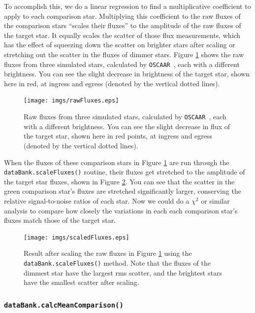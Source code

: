 \documentclass[a4paper]{article}
\newcommand{\code}[1]{\texttt{#1}}
\newcommand{\oscaar}{\code{OSCAAR}~}
\begin{document}
To accomplish this, we do a linear regression to find a multiplicative coefficient to apply to each comparison star. Multiplying this coefficient to the raw fluxes of the comparison stars ``scales their fluxes'' to the amplitude of the raw fluxes of the target star. It equally scales the scatter of those flux measurements, which has the effect of squeezing down the scatter on brighter stars after scaling or stretching out the scatter in the fluxes of dimmer 
stars. Figure \ref{fig:rawFluxes} shows the raw fluxes from three simulated stars, calculated by \oscaar, each with a different brightness. You can see the slight decrease in brightness of the target star, shown here in red, at ingress and egress (denoted by the vertical dotted lines). 
\begin{figure}[H]
\begin{center}
\texttt{[image: imgs/rawFluxes.eps]}
\caption{Raw fluxes from three simulated stars, calculated by \oscaar, each with a different brightness. You can see the slight decrease in flux of the target star, shown here in red points, at ingress and egress (denoted by the vertical dotted lines).}
\label{fig:rawFluxes}
\end{center}	
\end{figure}

\noindent When the fluxes of these comparison stars in Figure \ref{fig:rawFluxes} are run through the \code{dataBank.scaleFluxes()} routine, their fluxes get stretched to the amplitude of the target star fluxes, shown in Figure \ref{fig:scaledFluxes}. You can see that the scatter in the green comparison star's fluxes are stretched significantly larger, conserving the relative signal-to-noise ratios of each star. Now we could do a $\chi^2$ or similar analysis to compare how closely the variations in each each comparison star's fluxes match those of the target star. 

\begin{figure}[H]
\begin{center}
\texttt{[image: imgs/scaledFluxes.eps]}
\caption{Result after scaling the raw fluxes in Figure \ref{fig:rawFluxes} using the \code{dataBank.scaleFluxes()} method. Note that the fluxes of the dimmest star have the largest rms scatter, and the brightest stars have the smallest scatter after scaling.}
\label{fig:scaledFluxes}
\end{center}	
\end{figure}


\subsubsection{\code{dataBank.calcMeanComparison()}} \label{sec:calcMeanComp}
\end{document}
